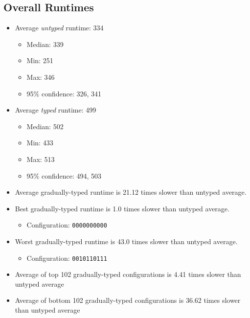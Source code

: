 \documentclass{article}
\newcommand{\mono}[1]{\texttt{#1}}
\begin{document}
\subsection{Overall Runtimes}
\begin{itemize}
\item Average \emph{untyped} runtime: 334
  \begin{itemize}
  \item Median: 339
  \item Min: 251
  \item Max: 346
  \item 95\% confidence: 326, 341
  \end{itemize}
\item Average \emph{typed} runtime: 499
  \begin{itemize}
  \item Median: 502
  \item Min: 433
  \item Max: 513
  \item 95\% confidence: 494, 503
  \end{itemize}
\item Average gradually-typed runtime is 21.12 times slower than untyped average.
\item Best gradually-typed runtime is 1.0 times slower than untyped average.
\begin{itemize}\item Configuration: \mono{0000000000}\end{itemize}
\item Worst gradually-typed runtime is 43.0 times slower than untyped average.
\begin{itemize}\item Configuration: \mono{0010110111}\end{itemize}
\item Average of top 102 gradually-typed configurations is 4.41 times slower than untyped average
\item Average of bottom 102 gradually-typed configurations is 36.62 times slower than untyped average
\end{itemize}
\end{document}
